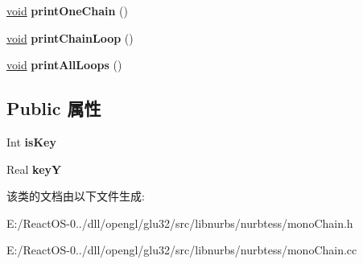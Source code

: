 \begin{DoxyCompactItemize}
\mbox{\label{classmono_chain_af612f64e89e0cb82954a1fa36d11be4f}} 
\hyperlink{interfacevoid}{void} {\bfseries print\+One\+Chain} ()
\item 
\mbox{\label{classmono_chain_a88b356036a4aa9ebb23ef42c144cbff9}} 
\hyperlink{interfacevoid}{void} {\bfseries print\+Chain\+Loop} ()
\item 
\mbox{\label{classmono_chain_a30c5ff1c5dc25e2c11a613fd3ecb960b}} 
\hyperlink{interfacevoid}{void} {\bfseries print\+All\+Loops} ()
\end{DoxyCompactItemize}
\subsection*{Public 属性}
\begin{DoxyCompactItemize}
\item 
\mbox{\label{classmono_chain_ac85dad088532d5ed444f6dfd35a11504}} 
Int {\bfseries is\+Key}
\item 
\mbox{\label{classmono_chain_ae962adfd722f6da3cf9eb7a401558d71}} 
Real {\bfseries keyY}
\end{DoxyCompactItemize}


该类的文档由以下文件生成\+:\begin{DoxyCompactItemize}
\item 
E\+:/\+React\+O\+S-\/0../dll/opengl/glu32/src/libnurbs/nurbtess/mono\+Chain.\+h\item 
E\+:/\+React\+O\+S-\/0../dll/opengl/glu32/src/libnurbs/nurbtess/mono\+Chain.\+cc\end{DoxyCompactItemize}
